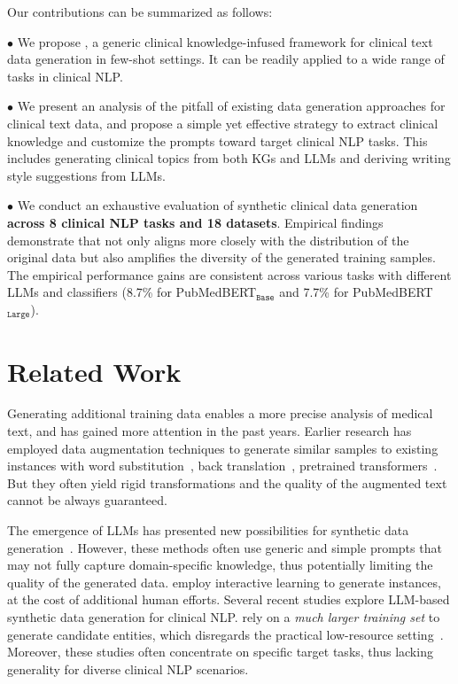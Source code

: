 Our contributions can be summarized as follows:

$\bullet$ We propose {\ours}, a generic clinical knowledge-infused framework for clinical text data generation in few-shot settings. It can be readily applied to a wide range of tasks in clinical NLP.

$\bullet$ We present an analysis of the pitfall of existing data generation approaches for clinical text data, and propose a 
simple yet effective strategy to extract clinical knowledge and customize the prompts toward target clinical NLP tasks. This includes generating clinical topics from both KGs and LLMs and deriving writing style suggestions from LLMs. 

$\bullet$ We conduct an exhaustive evaluation of synthetic clinical data generation \textbf{across 8 clinical NLP tasks and 18 datasets}. Empirical findings demonstrate that {\ours} not only aligns more closely with the distribution of the original data but also amplifies the diversity of the generated training samples. The empirical performance gains are consistent across various tasks with different LLMs and classifiers (8.7\% for PubMedBERT$_{\texttt{Base}}$ and 7.7\% for PubMedBERT$_{\texttt{Large}}$).

\section{Related Work}
Generating additional training data enables a more precise analysis of medical text, and has gained more attention in the past years. 
Earlier research has employed data augmentation techniques to generate similar samples to existing instances with word substitution~\citep{kang2021umls}, back translation~\citep{uda}, pretrained transformers~\citep{xu2023weakly,melm}. But they often yield rigid transformations and the quality of the augmented text cannot be always guaranteed. 

The emergence of LLMs has presented new possibilities for synthetic data generation~\citep{meng2022generating,meng2023tuning,ye2022zerogen,li-etal-2023-synthetic}. However, these methods often use generic and simple prompts that may not fully capture domain-specific knowledge, thus potentially limiting the quality of the generated data. 
\citet{liu2022wanli,chung-etal-2023-increasing,yu2023large} employ interactive learning to generate instances, at the cost of additional human efforts.
Several recent studies explore LLM-based synthetic data generation for clinical NLP.  
\citet{tang2023does} rely on a \emph{much larger training set} to generate candidate entities, which {disregards the practical low-resource setting}~\citep{perez2021true}. 
Moreover, these studies often concentrate on specific target tasks, thus lacking generality for diverse clinical NLP scenarios.


